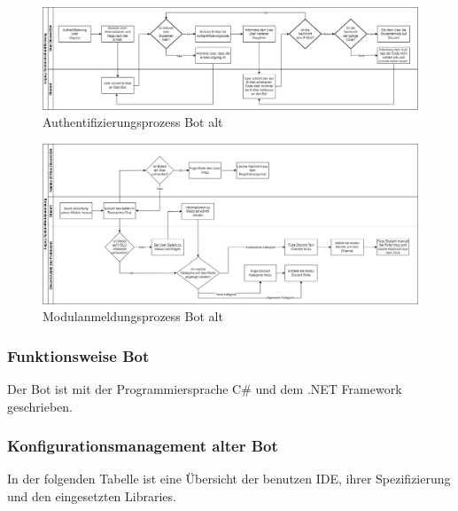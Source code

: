 \documentclass[a4paper, table]{article}
\begin{document}
\begin{landscape}
    \begin{figure}[ht]
        \centering
        \hspace*{-4.1cm}
        \includegraphics[width=1.9\textwidth]{img/Authentifizierungsprozess_Bot_alt.png}
        \caption{Authentifizierungsprozess Bot alt}
        \label{fig:Authentifizierungsprozess_Bot_alt}
    \end{figure}
    \clearpage
    \begin{figure}[ht]
        \centering
        \hspace*{-4.1cm}
        \includegraphics[width=1.9\textwidth]{img/Modulanmeldungsprozess_Bot_alt.png}
        \caption{Modulanmeldungsprozess Bot alt}
        \label{fig:Modulanmeldungsprozess_Bot_alt}
    \end{figure}
\end{landscape}

\subsubsection{Funktionsweise Bot}
Der Bot ist mit der Programmiersprache C\# und dem .NET Framework geschrieben.

\subsubsection*{Konfigurationsmanagement alter Bot}
In der folgenden Tabelle ist eine \"Ubersicht der benutzen IDE, ihrer Spezifizierung und den eingesetzten Libraries.
\end{document}
